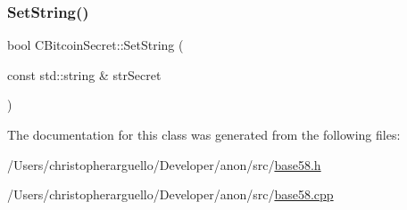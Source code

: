 \mbox{\label{class_c_bitcoin_secret_a83cfc3b34aac494efdd6e316cd08626d}} 
\subsubsection{\texorpdfstring{Set\+String()}{SetString()}\hspace{0.1cm}{\footnotesize\ttfamily [2/2]}}
{\footnotesize\ttfamily bool C\+Bitcoin\+Secret\+::\+Set\+String (\begin{DoxyParamCaption}\item[{const std\+::string \&}]{str\+Secret }\end{DoxyParamCaption})}



The documentation for this class was generated from the following files\+:\begin{DoxyCompactItemize}
\item 
/\+Users/christopherarguello/\+Developer/anon/src/\mbox{\hyperlink{base58_8h}{base58.\+h}}\item 
/\+Users/christopherarguello/\+Developer/anon/src/\mbox{\hyperlink{base58_8cpp}{base58.\+cpp}}\end{DoxyCompactItemize}
